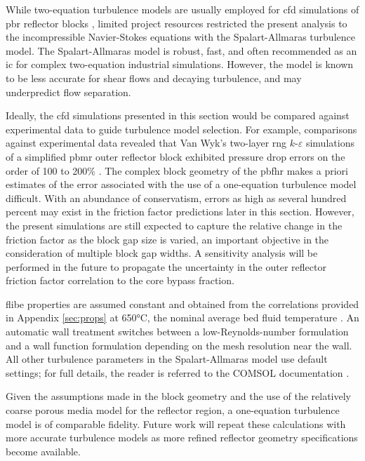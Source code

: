 While two-equation turbulence models are usually employed for \gls{cfd} simulations of \gls{pbr} reflector blocks \cite{ximing,peng,wyk,liu_2018}, limited project resources restricted the present analysis to the incompressible Navier-Stokes equations with the Spalart-Allmaras turbulence model. The Spalart-Allmaras model is robust, fast, and often recommended as an \gls{ic} for complex two-equation industrial simulations. However, the model is known to be less accurate for shear flows and decaying turbulence, and may underpredict flow separation. 

Ideally, the \gls{cfd} simulations presented in this section would be compared against experimental data to guide turbulence model selection. For example, comparisons against experimental data revealed that Van Wyk's two-layer \gls{rng} \(k\)-\(\varepsilon\) simulations of a simplified \gls{pbmr} outer reflector block exhibited pressure drop errors on the order of 100 to 200\% \cite{wyk}. The complex block geometry of the \gls{pbfhr} makes a priori estimates of the error associated with the use of a one-equation turbulence model difficult. With an abundance of conservatism, errors as high as several hundred percent may exist in the friction factor predictions later in this section. However, the present simulations are still expected to capture the relative change in the friction factor as the block gap size is varied, an important objective in the consideration of multiple block gap widths. A sensitivity analysis will be performed in the future to propagate the uncertainty in the outer reflector friction factor correlation to the core bypass fraction.

\gls{flibe} properties are assumed constant and obtained from the correlations provided in Appendix \ref{sec:props} at 650\si{\celsius}, the nominal average bed fluid temperature \cite{novak_manual_2020}. An automatic wall treatment switches between a low-Reynolds-number formulation and a wall function formulation depending on the mesh resolution near the wall. All other turbulence parameters in the Spalart-Allmaras model use default settings; for full details, the reader is referred to the COMSOL documentation \cite{comsol_cfd}.

Given the assumptions made in the block geometry and the use of the relatively coarse porous media model for the reflector region, a one-equation turbulence model is of comparable fidelity. Future work will repeat these calculations with more accurate turbulence models as more refined reflector geometry specifications become available.

